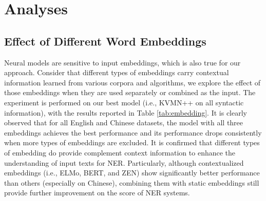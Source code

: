 \documentclass[11pt,a4paper]{article}
\begin{document}



\section{Analyses}

\subsection{Effect of Different Word Embeddings}




Neural models are sensitive to input embeddings, which is also true for our approach.
Consider that different types of embeddings carry contextual information learned from various corpora and algorithms, we explore the effect of those embeddings when they are used separately or combined as the input.
The experiment is performed on our best model (i.e., KVMN++ on all syntactic information),
with the results reported in Table \ref{tab:embedding}.
It is clearly observed
that for all English and Chinese datasets, the model with all three embeddings achieves the best performance and its performance drops consistently when more types of embeddings are excluded.
It is confirmed that different types of embedding do provide complement context information to enhance the understanding of input texts for NER.
Particularly, although contextualized embeddings (i.e., ELMo, BERT, and ZEN) show significantly better performance than others (especially on Chinese),
combining them with static embeddings still provide further improvement on the  score of NER systems.
\end{document}
